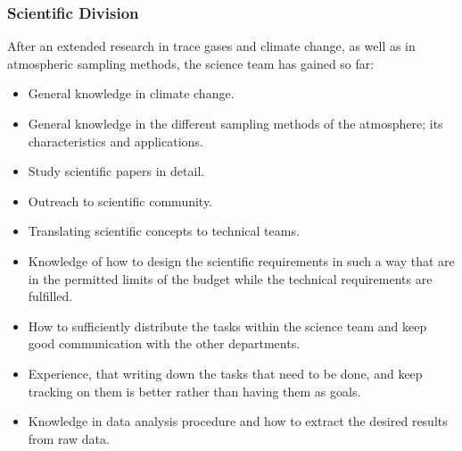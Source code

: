 \subsubsection{Scientific Division}
After an extended research in trace gases and climate change, as well as in atmospheric sampling methods, the science team has gained so far: 
\begin{itemize}
    \item General knowledge in climate change.
    \item General knowledge in the different sampling methods of the atmosphere; its characteristics and applications.
    \item Study scientific papers in detail.
    \item Outreach to scientific community.
    \item Translating scientific concepts to technical teams.
    \item Knowledge of how to design the scientific requirements in such a way that are in the permitted limits of the budget while the technical requirements are fulfilled.   
    \item How to sufficiently distribute the tasks within the science team and keep good communication with the other departments. 
    \item Experience, that writing down the tasks that need to be done, and keep tracking on them is better rather than having them as goals.   
    \item Knowledge in data analysis procedure and how to extract the desired results from raw data.
\end{itemize}


